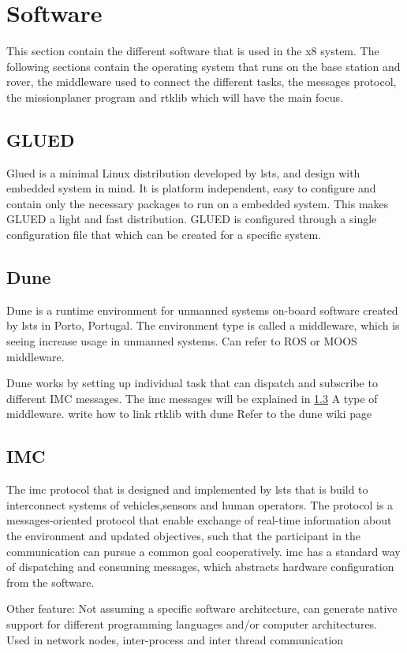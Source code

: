 \section{Software}\label{S:software}
This section contain the different software that is used in the x8 system. The following sections contain the operating system that runs on the base station and rover, the middleware used to connect the different tasks, the messages protocol, the missionplaner program and rtklib which will have the main focus.\subsection{GLUED}
Glued is a minimal Linux distribution developed by \gls{lsts}, and design with embedded system in mind. It is platform independent, easy to configure and contain only the necessary packages to run on a embedded system. This makes GLUED a light and fast distribution. GLUED is configured through a single configuration file that which can be created for a specific system. 
\subsection{Dune}
Dune is a runtime environment for unmanned systems on-board software created by \gls{lsts} in Porto, Portugal. The environment type is called a middleware, which is seeing increase usage in unmanned systems. Can refer to ROS or MOOS middleware.

Dune works by setting up individual task that can dispatch and subscribe to different IMC messages. The \gls{imc} messages will be explained in \ref{ss:IMC}
A type of middleware. write how to link rtklib with dune
Refer to the dune wiki page
\subsection{IMC}\label{ss:IMC}
The \gls{imc} protocol that is designed and implemented by \gls{lsts} that is build to interconnect systems of vehicles,sensors and human operators. The protocol is a messages-oriented protocol that enable exchange of real-time information about the environment and updated objectives, such that the participant in the communication can pursue a common goal cooperatively.
\gls{imc} has a standard way of dispatching and consuming messages, which abstracts hardware configuration from the software.

Other feature: Not assuming a specific software architecture, can generate native support for different programming languages and/or computer architectures. Used in network nodes, inter-process and inter thread communication

